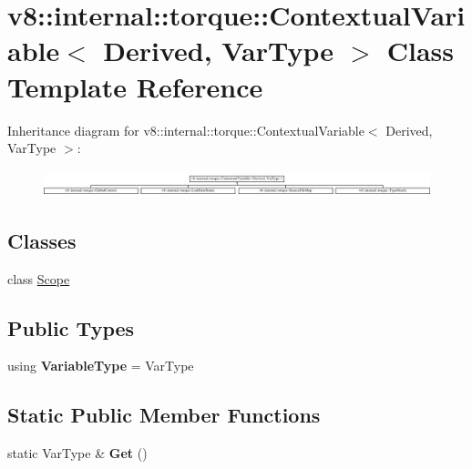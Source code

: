 \hypertarget{classv8_1_1internal_1_1torque_1_1ContextualVariable}{}\section{v8\+:\+:internal\+:\+:torque\+:\+:Contextual\+Variable$<$ Derived, Var\+Type $>$ Class Template Reference}
\label{classv8_1_1internal_1_1torque_1_1ContextualVariable}
Inheritance diagram for v8\+:\+:internal\+:\+:torque\+:\+:Contextual\+Variable$<$ Derived, Var\+Type $>$\+:\begin{figure}[H]
\begin{center}
\leavevmode
\includegraphics[height=0.771350cm]{classv8_1_1internal_1_1torque_1_1ContextualVariable}
\end{center}
\end{figure}
\subsection*{Classes}
\begin{DoxyCompactItemize}
\item 
class \mbox{\hyperlink{classv8_1_1internal_1_1torque_1_1ContextualVariable_1_1Scope}{Scope}}
\end{DoxyCompactItemize}
\subsection*{Public Types}
\begin{DoxyCompactItemize}
\item 
\mbox{\label{classv8_1_1internal_1_1torque_1_1ContextualVariable_aca578dc094d1887f027441f94eb89f50}} 
using {\bfseries Variable\+Type} = Var\+Type
\end{DoxyCompactItemize}
\subsection*{Static Public Member Functions}
\begin{DoxyCompactItemize}
\item 
\mbox{\label{classv8_1_1internal_1_1torque_1_1ContextualVariable_af1616e95aadf31cdf2cc1ff9e9e77c78}} 
static Var\+Type \& {\bfseries Get} ()
\end{DoxyCompactItemize}


